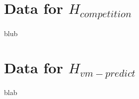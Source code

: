 
\newpage
\section*{Data for $ H_{competition} $}
blub


\section*{Data for $ H_{vm-predict} $}
blab